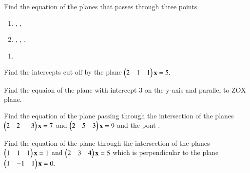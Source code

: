 \item Find the equation of the planes that passes through three points
\begin{enumerate}
\item {}, , 
\item {}, , .
\end{enumerate}
\solution
\begin{enumerate}
    \item 

\end{enumerate}
\item Find the intercepts cut off by the plane 
$
\begin{pmatrix}2 & 1 & 1\end{pmatrix}\mathbf{x}=5.
$
\item Find the equaion of the plane with intercept 3 on the y-axis and parallel to ZOX plane.
\\
\solution

\item Find the equation of the plane passing through the intersection of the planes 
$
\begin{pmatrix}2 & 2 & -3\end{pmatrix}\mathbf{x}=7
$
 and 
$
\begin{pmatrix}2 & 5 & 3\end{pmatrix}\mathbf{x}=9
$
and the pont .
%
\\
\solution

\item  Find the equation of the plane through the intersection of the planes
$
\begin{pmatrix}1 & 1 & 1\end{pmatrix}\mathbf{x}=1
$
 and 
$
\begin{pmatrix}2 & 3 & 4\end{pmatrix}\mathbf{x}=5
$
which is perpendicular to the plane 
$
\begin{pmatrix}1 & -1 & 1\end{pmatrix}\mathbf{x}=0.
$
%
\\
\solution


